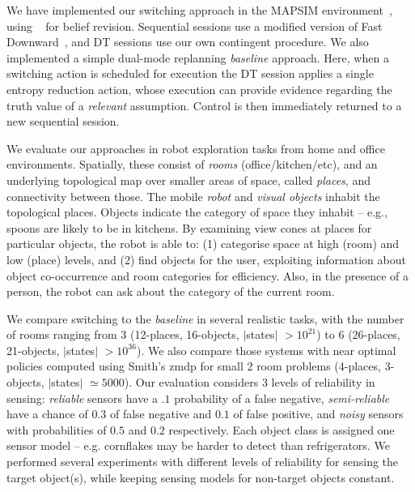 
We have implemented our switching approach in the MAPSIM
environment~\cite{brenner:nebel:jaamas09},
using ~\cite{king:2009} for belief
revision. Sequential sessions use a modified version of Fast
Downward~\cite{fast-downward}, and DT sessions use our own contingent
procedure. We also implemented a simple dual-mode replanning {\em
baseline} approach. Here, when a switching action is scheduled for
execution the DT session applies a single entropy reduction action,
whose execution can provide evidence regarding the truth value of a
{\em relevant} assumption.
Control is then immediately
returned to a new sequential session.


We evaluate our approaches in robot exploration tasks from home and
office environments. Spatially, these consist of {\em rooms}
(office/kitchen/etc), and an underlying topological map over
smaller areas of space, called {\em places}, and connectivity between
those. The mobile {\em robot} and {\em visual objects} inhabit the
topological places. Objects indicate the category of space they
inhabit -- e.g., spoons are likely to be in kitchens. By examining
view cones at places for particular objects, the robot is able to: (1)
categorise space at high (room) and low (place) levels, and (2) find
objects for the user, exploiting information about object
co-occurrence and room categories for efficiency. Also, in the
presence of a person, the robot can ask about the category of the
current room.


We compare switching to the {\em baseline} in several realistic
tasks, with the number of rooms ranging from 3 (12-places, 16-objects,
$|$states$|$ $>10^{21}$) to 6 (26-places, 21-objects, $|$states$|$
$>10^{36}$). We also compare those systems with near optimal policies
computed using Smith's {\sc zmdp} for small 2 room problems (4-places,
3-objects, $|$states$|$ $\simeq 5000$). Our evaluation considers 3
levels of reliability in sensing: {\em reliable} sensors have a $.1$
probability of a false negative, {\em semi-reliable} have a chance of
$0.3$ of false negative and $0.1$ of false positive, and {\em noisy}
sensors with probabilities of $0.5$ and $0.2$ respectively. Each
object class is assigned one sensor model -- e.g. cornflakes may be
harder to detect than refrigerators. We performed several experiments
with different levels of reliability for sensing the target object(s),
while keeping sensing models for non-target objects constant.

